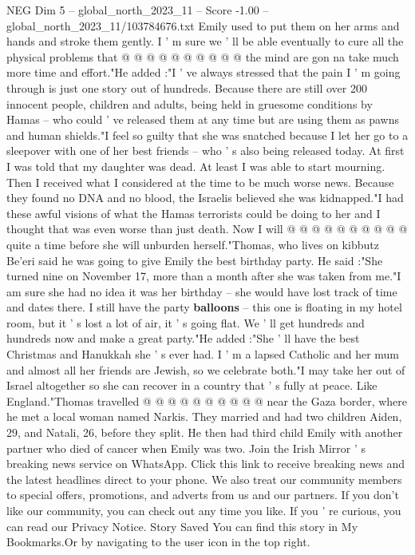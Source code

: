 \begin{textsample}{NEG Dim 5 – global\_north\_2023\_11 – Score -1.00 – global\_north\_2023\_11/103784676.txt}
Emily used to put them on her arms and hands and stroke them gently.
I ' m sure we ' ll be able eventually to cure all the physical problems that @ @ @ @ @ @ @ @ @ @ the mind are gon na take much more time and effort."He added :"I ' ve always stressed that the pain I ' m going through is just one story out of hundreds.
Because there are still over 200 innocent people, children and adults, being held in gruesome conditions by Hamas -- who could ' ve released them at any time but are using them as pawns and human shields."I feel so guilty that she was snatched because I let her go to a sleepover with one of her best friends -- who ' s also being released today.
At first I was told that my daughter was dead.
At least I was able to start mourning.
Then I received what I considered at the time to be much worse news.
Because they found no DNA and no blood, the Israelis believed she was kidnapped."I had these awful visions of what the Hamas terrorists could be doing to her and I thought that was even worse than just death.
Now I will @ @ @ @ @ @ @ @ @ @ quite a time before she will unburden herself."Thomas, who lives on kibbutz Be'eri said he was going to give Emily the best birthday party.
He said :"She turned nine on November 17, more than a month after she was taken from me."I am sure she had no idea it was her birthday -- she would have lost track of time and dates there.
I still have the party \textbf{balloons} -- this one is floating in my hotel room, but it ' s lost a lot of air, it ' s going flat.
We ' ll get hundreds and hundreds now and make a great party."He added :"She ' ll have the best Christmas and Hanukkah she ' s ever had.
I ' m a lapsed Catholic and her mum and almost all her friends are Jewish, so we celebrate both."I may take her out of Israel altogether so she can recover in a country that ' s fully at peace.
Like England."Thomas travelled @ @ @ @ @ @ @ @ @ @ near the Gaza border, where he met a local woman named Narkis.
They married and had two children Aiden, 29, and Natali, 26, before they split.
He then had third child Emily with another partner who died of cancer when Emily was two.
Join the Irish Mirror ' s breaking news service on WhatsApp.
Click this link to receive breaking news and the latest headlines direct to your phone.
We also treat our community members to special offers, promotions, and adverts from us and our partners.
If you don't like our community, you can check out any time you like.
If you ' re curious, you can read our Privacy Notice.
Story Saved You can find this story in My Bookmarks.Or by navigating to the user icon in the top right.

\end{textsample}

